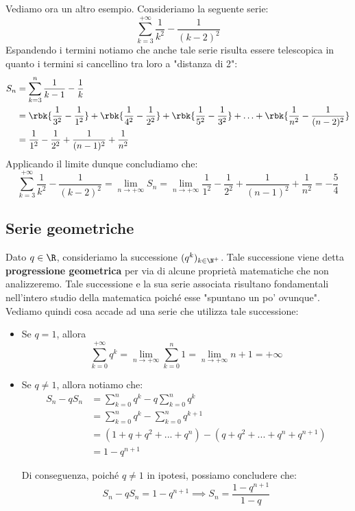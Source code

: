 \documentclass[a4paper, 12pt]{report}
\begin{document}
    Vediamo ora un altro esempio. Consideriamo la seguente serie:
    \[\sum_{k = 3}^{+\infty} \frac{1}{k^2} - \frac{1}{(k-2)^2}\]
    Espandendo i termini notiamo che anche tale serie risulta essere telescopica in quanto i termini si cancellino tra loro a "distanza di 2":
    \[\begin{split}
        S_n &= \sum_{k = 3}^{n} \frac{1}{k-1} - \frac{1}{k} \\
        &= \rbk{\frac{1}{3^2} - \frac{1}{1^2}} + \rbk{\frac{1}{4^2} - \frac{1}{2^2}} + \rbk{\frac{1}{5^2} - \frac{1}{3^2}} + \ldots + \rbk{\frac{1}{n^2} - \frac{1}{(n-2)^2}} \\
        &= \frac{1}{1^2} - \frac{1}{2^2} + \frac{1}{(n-1)^2} + \frac{1}{n^2}
    \end{split}\]
    Applicando il limite dunque concludiamo che:
    \[\sum_{k = 3}^{+\infty} \frac{1}{k^2} - \frac{1}{(k-2)^2} = \lim_{n \to +\infty} S_n = \lim_{n \to +\infty} \frac{1}{1^2} - \frac{1}{2^2} + \frac{1}{(n-1)^2} + \frac{1}{n^2} = -\frac{5}{4}\]

    \quad

    \subsection{Serie geometriche}
    
    Dato $q \in \R$, consideriamo la successione $(q^k)_{k \in \N^+}$. Tale successione viene detta \textbf{progressione geometrica} per via di alcune proprietà matematiche che non analizzeremo. Tale successione e la sua serie associata risultano fondamentali nell'intero studio della matematica poiché esse "spuntano un po' ovunque". Vediamo quindi cosa accade ad una serie che utilizza tale successione:
    \begin{itemize}
        \item Se $q=1$, allora 
        \[ \sum_{k = 0}^{+\infty} q^k = \lim_{n \to +\infty} \sum_{k = 0}^n 1 = \lim_{n \to +\infty} n+1 = +\infty\]
        
        \item Se $q \neq 1$, allora notiamo che:
        \[\begin{split}
            S_n - qS_n &= \sum_{k=0}^n q^k - q \sum_{k=0}^n q^k \\
            &= \sum_{k=0}^n q^k - \sum_{k=0}^n q^{k+1} \\
            &= (1 + q + q^2 + ... + q^n) - (q + q^2 + ... + q^n + q^{n+1}) \\
            &= 1 - q^{n+1}
        \end{split}\]

        Di conseguenza, poiché $q \neq 1$ in ipotesi, possiamo concludere che:
        \[S_n - qS_n = 1 - q^{n+1} \implies S_n = \frac{1-q^{n+1}}{1-q}\]
    \end{itemize}
    
\end{document}
